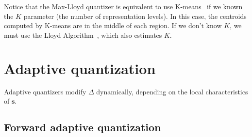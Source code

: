 Notice that the Max-Lloyd quantizer is equivalent to use
K-means~\cite{hartigan1979algorithm} if we known the $K$ parameter
(the number of representation levels). In this case, the centroids
computed by K-means are in the middle of each region. If we don't know
$K$, we must use the Lloyd Algorithm~\cite{hartigan1979algorithm},
which also estimates $K$.


\section{Adaptive quantization}

Adaptive quantizers modify $\Delta$ dynamically, depending on the local
characteristics of ${\mathbf s}$.


\subsection{Forward adaptive quantization}

